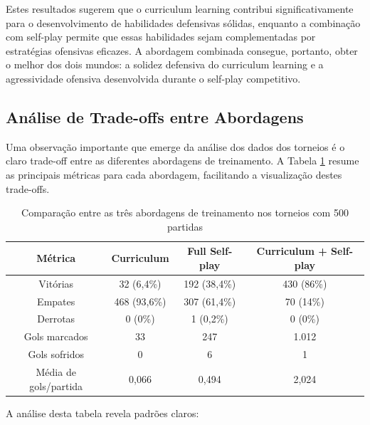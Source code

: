 Estes resultados sugerem que o curriculum learning contribui significativamente para o desenvolvimento de habilidades defensivas sólidas, enquanto a combinação com self-play permite que essas habilidades sejam complementadas por estratégias ofensivas eficazes. A abordagem combinada consegue, portanto, obter o melhor dos dois mundos: a solidez defensiva do curriculum learning e a agressividade ofensiva desenvolvida durante o self-play competitivo.

\subsection{Análise de Trade-offs entre Abordagens}

Uma observação importante que emerge da análise dos dados dos torneios é o claro trade-off entre as diferentes abordagens de treinamento. A Tabela \ref{tab:comparacao_abordagens} resume as principais métricas para cada abordagem, facilitando a visualização destes trade-offs.

\begin{table}[H]
    \centering
    \begin{tabular}{|c|c|c|c|}
        \hline
        \textbf{Métrica} & \textbf{Curriculum} & \textbf{Full Self-play} & \textbf{Curriculum + Self-play} \\
        \hline
        Vitórias & 32 (6,4\%) & 192 (38,4\%) & 430 (86\%) \\
        \hline
        Empates & 468 (93,6\%) & 307 (61,4\%) & 70 (14\%) \\
        \hline
        Derrotas & 0 (0\%) & 1 (0,2\%) & 0 (0\%) \\
        \hline
        Gols marcados & 33 & 247 & 1.012 \\
        \hline
        Gols sofridos & 0 & 6 & 1 \\
        \hline
        Média de gols/partida & 0,066 & 0,494 & 2,024 \\
        \hline
    \end{tabular}
    \caption{Comparação entre as três abordagens de treinamento nos torneios com 500 partidas}
    \label{tab:comparacao_abordagens}
\end{table}

A análise desta tabela revela padrões claros:

